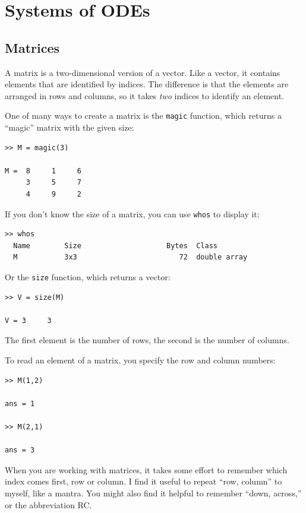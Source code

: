 \documentclass{book}
\begin{document}
\chapter{Systems of ODEs}

\section{Matrices}

A matrix is a two-dimensional version of a vector.  Like a vector,
it contains elements that are identified by indices.  The difference
is that the elements are arranged in rows and columns, so it takes
{\em two} indices to identify an element.

One of many ways to create a matrix is the {\tt magic} function,
which returns a ``magic'' matrix with the given size:

\begin{verbatim}
>> M = magic(3)

M =  8     1     6
     3     5     7
     4     9     2
\end{verbatim}

If you don't know the size of a matrix, you can use {\tt whos} to
display it:

\begin{verbatim}
>> whos
  Name        Size                    Bytes  Class
  M           3x3                        72  double array
\end{verbatim}

Or the {\tt size} function, which returns a vector:

\begin{verbatim}
>> V = size(M)

V = 3     3
\end{verbatim}

The first element is the number of rows, the second is the number of
columns.

To read an element of a matrix, you specify the row and column numbers:

\begin{verbatim}
>> M(1,2)

ans = 1

>> M(2,1)

ans = 3
\end{verbatim}

When you are working with matrices, it takes some effort to remember
which index comes first, row or column.  I find it useful to repeat
``row, column'' to myself, like a mantra.  You might also find it
helpful to remember ``down, across,'' or the abbreviation RC.
\end{document}
